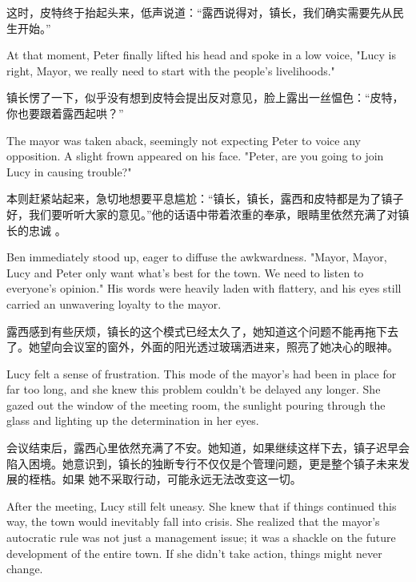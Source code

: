 这时，皮特终于抬起头来，低声说道：“露西说得对，镇长，我们确实需要先从民生开始。”

\begin{flushright} At that moment, Peter finally lifted his head and spoke in a
    low voice, "Lucy is right, Mayor, we really need to start with the people’s
    livelihoods." \end{flushright}

镇长愣了一下，似乎没有想到皮特会提出反对意见，脸上露出一丝愠色：“皮特，你也要跟着露西起哄？”

\begin{flushright} The mayor was taken aback, seemingly not expecting Peter to
    voice any opposition. A slight frown appeared on his face. "Peter, are you
    going
    to join Lucy in causing trouble?" \end{flushright}

本则赶紧站起来，急切地想要平息尴尬：“镇长，镇长，露西和皮特都是为了镇子好，我们要听听大家的意见。”他的话语中带着浓重的奉承，眼睛里依然充满了对镇长的忠诚
。

\begin{flushright} Ben immediately stood up, eager to diffuse the awkwardness.
    "Mayor, Mayor, Lucy and Peter only want what’s best for the town. We need
    to
    listen to everyone’s opinion." His words were heavily laden with flattery,
    and
    his eyes still carried an unwavering loyalty to the mayor. \end{flushright}

露西感到有些厌烦，镇长的这个模式已经太久了，她知道这个问题不能再拖下去了。她望向会议室的窗外，外面的阳光透过玻璃洒进来，照亮了她决心的眼神。

\begin{flushright} Lucy felt a sense of frustration. This mode of the mayor's
    had been in place for far too long, and she knew this problem couldn’t be
    delayed any longer. She gazed out the window of the meeting room, the
    sunlight
    pouring through the glass and lighting up the determination in her eyes.
\end{flushright}

会议结束后，露西心里依然充满了不安。她知道，如果继续这样下去，镇子迟早会陷入困境。她意识到，镇长的独断专行不仅仅是个管理问题，更是整个镇子未来发展的桎梏。如果
她不采取行动，可能永远无法改变这一切。

\begin{flushright} After the meeting, Lucy still felt uneasy. She knew that if
    things continued this way, the town would inevitably fall into crisis. She
    realized that the mayor’s autocratic rule was not just a management issue;
    it
    was a shackle on the future development of the entire town. If she didn’t
    take
    action, things might never change. \end{flushright}

